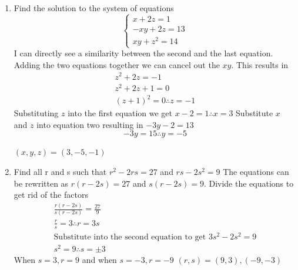 \documentclass[10pt]{article}
\begin{document}
\begin{enumerate}
    \item Find the solution to the system of equations \\
      \[
        \begin{cases}
          x+2z = 1 \\
          -xy + 2z = 13 \\
          xy + z^2 = 14
        \end{cases}
      \] 
      I can directly see a similarity between the second and the last equation. Adding the two equations together we can cancel out the $xy$. This results in
      \begin{align*}
          z^2+2z=-1 \\
          z^2+2z+1=0 \\
          (z+1)^2=0 \therefore z=-1
      \end{align*}
      Substituting $z$ into the first equation we get $x-2=1 \therefore x=3$
      Substitute $x$ and $z$ into equation two resulting in $-3y-2=13$ $$-3y=15 \therefore y=-5$$
      \centerline{$\boxed{(x,y,z)=(3,-5,-1)}$}
    \item Find all r and s such that $r^2-2rs=27$ and $rs-2s^2=9$
      The equations can be rewritten as $r(r-2s)=27$ and $s(r-2s)=9$. Divide the equations to get rid of the factors
      \begin{align*}
          \frac{r(r-2s)}{s(r-2s)} = \frac{27}{9} \\
          \frac{r}{s}=3 \therefore r=3s \\[5pt]
          \text{Substitute into the second equation to get } 3s^2-2s^2=9 \\[5pt]
          s^2=9 \therefore s=\pm3
      \end{align*}
      When $s=3, r=9$ and when $s=-3, r=-9$ \qquad
      $\boxed{(r,s)=(9,3),(-9,-3)}$
\end{enumerate}
\end{document}
